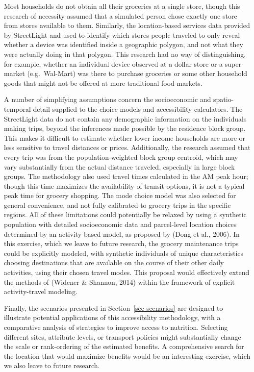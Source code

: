\documentclass[
  letterpaper,
  number,
  review,
  3p]{elsarticle}
\begin{document}
Most households do not obtain all their groceries at a single store,
though this research of necessity assumed that a simulated person chose
exactly one store from stores available to them. Similarly, the
location-based services data provided by StreetLight and used to
identify which stores people traveled to only reveal whether a device
was identified inside a geographic polygon, and not what they were
actually doing in that polygon. This research had no way of
distinguishing, for example, whether an individual device observed at a
dollar store or a super market (e.g.~Wal-Mart) was there to purchase
groceries or some other household goods that might not be offered at
more traditional food markets.

A number of simplifying assumptions concern the socioeconomic and
spatio-temporal detail supplied to the choice models and accessibility
calculators. The StreetLight data do not contain any demographic
information on the individuals making trips, beyond the inferences made
possible by the residence block group. This makes it difficult to
estimate whether lower income households are more or less sensitive to
travel distances or prices. Additionally, the research assumed that
every trip was from the population-weighted block group centroid, which
may vary substantially from the actual distance traveled, especially in
large block groups. The methodology also used travel times calculated in
the AM peak hour; though this time maximizes the availability of transit
options, it is not a typical peak time for grocery shopping. The mode
choice model was also selected for general convenience, and not fully
calibrated to grocery trips in the specific regions. All of these
limitations could potentially be relaxed by using a synthetic population
with detailed socioeconomic data and parcel-level location choices
determined by an activity-based model, as proposed by (Dong et al.,
2006). In this exercise, which we leave to future research, the grocery
maintenance trips could be explicitly modeled, with synthetic
individuals of unique characteristics choosing destinations that are
available on the course of their other daily activities, using their
chosen travel modes. This proposal would effectively extend the methods
of (Widener \& Shannon, 2014) within the framework of explicit
activity-travel modeling.

Finally, the scenarios presented in Section~\ref{sec-scenarios} are
designed to illustrate potential applications of this accessibility
methodology, with a comparative analysis of strategies to improve access
to nutrition. Selecting different sites, attribute levels, or transport
policies might substantially change the scale or rank-ordering of the
estimated benefits. A comprehensive search for the location that would
maximize benefits would be an interesting exercise, which we also leave
to future research.
\end{document}
